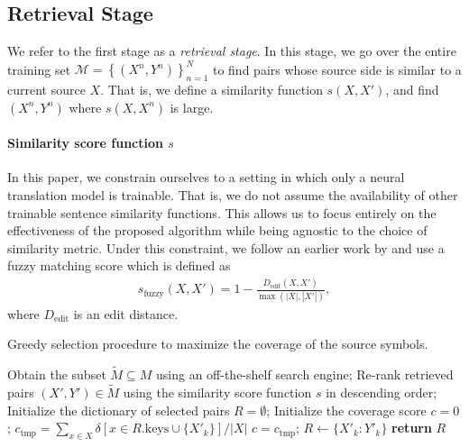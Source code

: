 \subsection{Retrieval Stage}

We refer to the first stage as a {\it retrieval stage}. In this stage, we go over the entire training set $\mathcal{M}=\left\{ (X^n, Y^n)\right\}_{n=1}^N$ to find pairs whose source side is similar to a current source $X$. That is, we define a similarity function $s(X, X')$, and find $(X^n, Y^n)$ where $s(X, X^n)$ is large. 

\paragraph{Similarity score function $s$}

In this paper, we constrain ourselves to a setting in which only a neural translation model is trainable. That is, we do not assume the availability of other trainable sentence similarity functions. This allows us to focus entirely on the effectiveness of the proposed algorithm while being agnostic to the choice of similarity metric. Under this constraint, we follow an earlier work by \citep{li2016phrase} and use a fuzzy matching score which is defined as 
\begin{align}
\label{eq.fuzzy}
s_{\text{fuzzy}}(X, X') = 1 - \frac{D_{\text{edit}}(X, X')}{\max\left(|X|, |X'|\right)},
\end{align}
where $D_{\text{edit}}$ is an edit distance. 

\begin{algorithm}[htpb]
\caption{Greedy selection procedure to maximize the coverage of the source symbols.} %
\label{algo1}
\begin{algorithmic}[1]
\small
{}
\State Obtain the subset $\tilde{M}\subseteq M$ using an off-the-shelf search engine;
\State Re-rank retrieved pairs $\left(X', Y' \right) \in \tilde{M}$ using the similarity score function $s$ in descending order;
\State Initialize the dictionary of selected pairs $R = \emptyset$; 
\State Initialize the coverage score $c=0$;
\State $c_{\text{tmp}}= \sum_{x \in X}\delta\left[ x \in R.\text{keys} \cup \{X'_k\}\right]/|X|$
\State $c = c_{\text{tmp}}$; $R \leftarrow \{X'_k: Y'_k\}$
\EndIf
\EndFor
\State \textbf{return} $R$
\end{algorithmic}
\end{algorithm}

